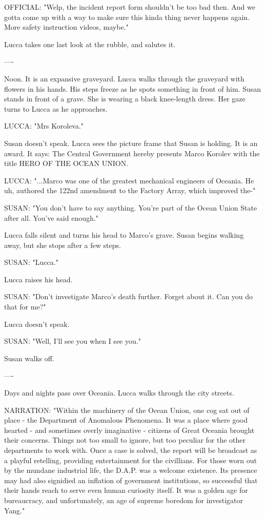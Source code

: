 \documentclass[11pt]{article}
\begin{document}
OFFICIAL: "Welp, the incident report form shouldn't be too bad then. 
And we gotta come up with a way to make sure this kinda thing never happens again. 
More safety instruction videos, maybe."

Lucca takes one last look at the rubble, and salutes it.

----

Noon. It is an expansive graveyard. 
Lucca walks through the graveyard with flowers in his hands. 
His steps freeze as he spots something in front of him. 
Susan stands in front of a grave. She is wearing a black knee-length dress. 
Her gaze turns to Lucca as he approaches. 

LUCCA: "Mrs Koroleva."

Susan doesn't speak. 
Lucca sees the picture frame that Susan is holding. 
It is an award.
It says: The Central Government hereby presents Marco Korolev with the title HERO OF THE OCEAN UNION.

LUCCA: "...Marco was one of the greatest mechanical engineers of Oceania. 
He uh, authored the 122nd amendment to the Factory Array, which improved the-"

SUSAN: "You don't have to say anything. You're part of the Ocean Union State after all. You've said enough."

Lucca falls silent and turns his head to Marco's grave. Susan begins walking away, but she stops after a few steps. 

SUSAN: "Lucca."

Lucca raises his head.

SUSAN: "Don't investigate Marco's death further. Forget about it. Can you do that for me?"

Lucca doesn't speak.

SUSAN: "Well, I'll see you when I see you."

Susan walks off.

----

Days and nights pass over Oceania. Lucca walks through the city streets. 

NARRATION: "Within the machinery of the Ocean Union, one cog sat out of place - the Department of Anomalous Phenomena. 
It was a place where good hearted - and sometimes overly imaginative - citizens of Great Oceania brought their concerns. 
Things not too small to ignore, but too peculiar for the other departments to work with. 
Once a case is solved, the report will be broadcast as a playful retelling, providing entertainment for the civillians. 
For those worn out by the mundane industrial life, the D.A.P. was a welcome existence. 
Its presence may had also signidied an inflation of government institutions, 
so successful that their hands reach to serve even human curiosity itself. 
It was a golden age for bureaucracy, and unfortunately, an age of supreme boredom for investigator Yang."
\end{document}
